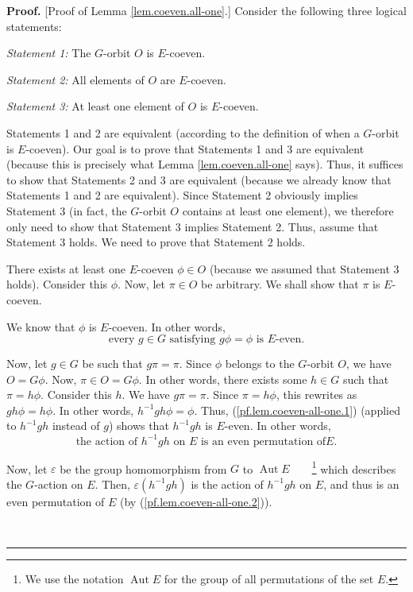 \documentclass[numbers=enddot,12pt,final,onecolumn,notitlepage,abstracton]{scrartcl}
\theoremstyle{definition}
\newenvironment{proof}[1][Proof]{\noindent\textbf{#1.} }{\ \rule{0.5em}{0.5em}}
\begin{document}
\begin{proof}
[Proof of Lemma \ref{lem.coeven.all-one}.] Consider the following three
logical statements:

\textit{Statement 1:} The $G$-orbit $O$ is $E$-coeven.

\textit{Statement 2:} All elements of $O$ are $E$-coeven.

\textit{Statement 3:} At least one element of $O$ is $E$-coeven.

Statements 1 and 2 are equivalent (according to the definition of
when a $G$-orbit is $E$-coeven).
Our goal is to prove that Statements 1 and 3 are
equivalent (because this is precisely what Lemma \ref{lem.coeven.all-one}
says). Thus, it suffices to show that Statements 2 and 3 are
equivalent (because we already know that Statements 1 and 2 are
equivalent). Since Statement 2 obviously implies Statement 3 (in fact,
the $G$-orbit $O$ contains at least one element), we therefore only
need to show that Statement 3 implies Statement 2. Thus, assume that Statement
3 holds. We need to prove that Statement 2 holds.

There exists at least one $E$-coeven $\phi\in O$ (because we assumed that
Statement 3 holds). Consider this $\phi$. Now, let $\pi\in O$ be arbitrary. We
shall show that $\pi$ is $E$-coeven.

We know that $\phi$ is $E$-coeven. In other words,
\begin{equation}
\text{every }g\in G\text{ satisfying }g\phi=\phi\text{ is }E\text{-even.}%
\label{pf.lem.coeven-all-one.1}%
\end{equation}


Now, let $g\in G$ be such that $g\pi=\pi$. Since $\phi$ belongs to the
$G$-orbit $O$, we have $O=G\phi$. Now, $\pi\in O=G\phi$. In other words, there
exists some $h\in G$ such that $\pi=h\phi$. Consider this $h$. We have
$g\pi=\pi$. Since $\pi=h\phi$, this rewrites as $gh\phi=h\phi$. In other
words, $h^{-1}gh\phi=\phi$. Thus, (\ref{pf.lem.coeven-all-one.1}) (applied to
$h^{-1}gh$ instead of $g$) shows that $h^{-1}gh$ is $E$-even. In other words,%
\begin{equation}
\text{the action of }h^{-1}gh\text{ on }E\text{ is an even permutation of
}E\text{.}\label{pf.lem.coeven-all-one.2}%
\end{equation}


Now, let $\varepsilon$ be the group homomorphism from $G$ to
$\operatorname{Aut}E$\ \ \ \ \footnote{We use the notation
$\operatorname{Aut}E$ for the group of all permutations
of the set $E$.} which describes the $G$-action on $E$. Then,
$\varepsilon\left(  h^{-1}gh\right)  $ is the action of $h^{-1}gh$ on $E$, and
thus is an even permutation of $E$ (by (\ref{pf.lem.coeven-all-one.2})).


\end{proof}
\end{document}
